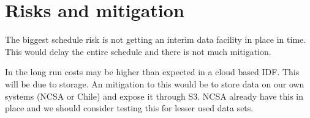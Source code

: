 \section{Risks and mitigation}

The biggest schedule risk is not getting an interim data facility in place in time.
This would delay the entire schedule and there is not much mitigation.

In the long run costs may be higher than expected in a cloud based IDF. This will be due to storage.
An mitigation to this would be to store data on our own systems (NCSA or Chile) and expose it through S3.
NCSA already have this in place and we should consider testing this for lesser used data sets.

